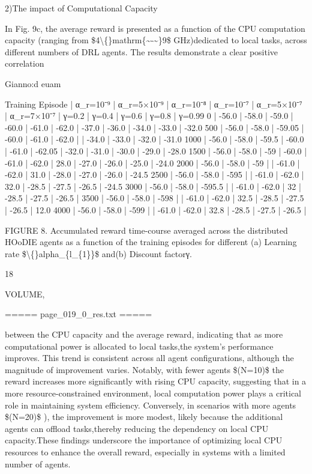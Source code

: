 \documentclass{article}
\begin{document}
2)The impact of Computational Capacity

In Fig. 9c, the average reward is presented as a function of the CPU computation capacity (ranging from \$4\textbackslash\{\}mathrm\{\textasciitilde{}-\textasciitilde{}\}9\$ GHz)dedicated to local tasks, across different numbers of DRL agents. The results demonstrate a clear positive correlation

Gianno:d euam

Training Episode | α\_r=10⁻⁹ | α\_r=5×10⁻⁹ | α\_r=10⁻⁸ | α\_r=10⁻⁷ | α\_r=5×10⁻⁷ | α\_r=7×10⁻⁷ | γ=0.2 | γ=0.4 | γ=0.6 | γ=0.8 | γ=0.99
0 | -56.0 | -58.0 | -59.0 | -60.0 | -61.0 | -62.0 | -37.0 | -36.0 | -34.0 | -33.0 | -32.0
500 | -56.0 | -58.0 | -59.05 | -60.0 | -61.0 | -62.0 |   | -34.0 | -33.0 | -32.0 | -31.0
1000 | -56.0 | -58.0 | -59.5 | -60.0 | -61.0 | -62.05 | -32.0 | -31.0 | -30.0 | -29.0 | -28.0
1500 | -56.0 | -58.0 | -59 | -60.0 | -61.0 | -62.0 | 28.0 | -27.0 | -26.0 | -25.0 | -24.0
2000 | -56.0 | -58.0 | -59 |   | -61.0 | -62.0 | 31.0 | -28.0 | -27.0 | -26.0 | -24.5
2500 | -56.0 | -58.0 | -595 |   | -61.0 | -62.0 | 32.0 | -28.5 | -27.5 | -26.5 | -24.5
3000 | -56.0 | -58.0 | -595.5 |   | -61.0 | -62.0 | 32 | -28.5 | -27.5 | -26.5 |  
3500 | -56.0 | -58.0 | -598 |   | -61.0 | -62.0 | 32.5 | -28.5 | -27.5 | -26.5 | 12.0
4000 | -56.0 | -58.0 | -599 |   | -61.0 | -62.0 | 32.8 | -28.5 | -27.5 | -26.5 |

FIGURE 8. Accumulated reward time-course averaged across the distributed HOoDIE agents as a function of the training episodes for different (a) Learning rate \$\textbackslash\{\}alpha\_\{l\_\{1\}\}\$ and(b) Discount factorγ.

18

VOLUME,

===== page\_019\_0\_res.txt =====


between the CPU capacity and the average reward, indicating that as more computational power is allocated to local tasks,the system's performance improves. This trend is consistent across all agent configurations, although the magnitude of improvement varies. Notably, with fewer agents \$(N=10)\$ the reward increases more significantly with rising CPU capacity, suggesting that in a more resource-constrained environment, local computation power plays a critical role in maintaining system efficiency. Conversely, in scenarios with more agents \$(N=20)\$ ), the improvement is more modest, likely because the additional agents can offload tasks,thereby reducing the dependency on local CPU capacity.These findings underscore the importance of optimizing local CPU resources to enhance the overall reward, especially in systems with a limited number of agents.
\end{document}
